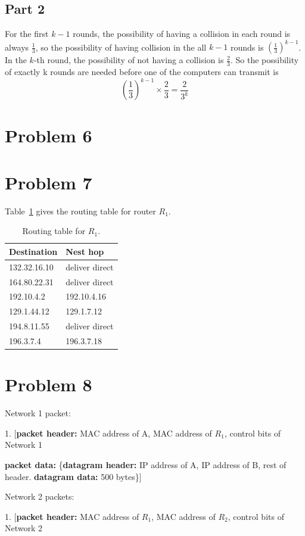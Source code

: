 \documentclass[paper=a4, fontsize=11pt]{scrartcl} %
\numberwithin{equation}{section} %
\numberwithin{figure}{section} %
\numberwithin{table}{section} %
\begin{document}
\subsection*{Part 2}
For the first $k - 1$ rounds, the possibility of having a collision in each round is always $\frac{1}{3}$, so the possibility of having collision in the all $k - 1$ rounds is $(\frac{1}{3})^{k-1}$. In the $k$-th round, the possibility of not having a collision is $\frac{2}{3}$. So the possibility of exactly k rounds are needed before one of the computers can transmit is
\[(\frac{1}{3})^{k-1} \times \frac{2}{3} = \frac{2}{3^k}\]

\section*{Problem 6}
\section*{Problem 7}
Table~\ref{tab:routingtable} gives the routing table for router $R_1$.
\begin{table}[htbp]
	\centering%
	\begin{tabular}{|l|l|} \hline 
		Destination & Nest hop  \\ \hline
		132.32.16.10 &deliver direct\\ \hline
		164.80.22.31&deliver direct\\ \hline
		192.10.4.2&192.10.4.16 \\ \hline
		129.1.44.12&129.1.7.12\\ \hline
		194.8.11.55&deliver direct\\ \hline
		196.3.7.4&196.3.7.18\\ \hline	
	\end{tabular}
	\caption{\small Routing table for $R_1$.}
	\label{tab:routingtable}
\end{table}
\section*{Problem 8}
Network 1 packet: 

1. [\textbf{packet header:} MAC address of A, MAC address of $R_1$, control bits of Network 1

\textbf{packet data:} \{\textbf{datagram header:} IP address of A, IP address of B, rest of header. \textbf{datagram data:} 500 bytes\}]

\bigskip
Network 2 packets: 

1. [\textbf{packet header:} MAC address of $R_1$, MAC address of $R_2$, control bits of Network 2
\end{document}
